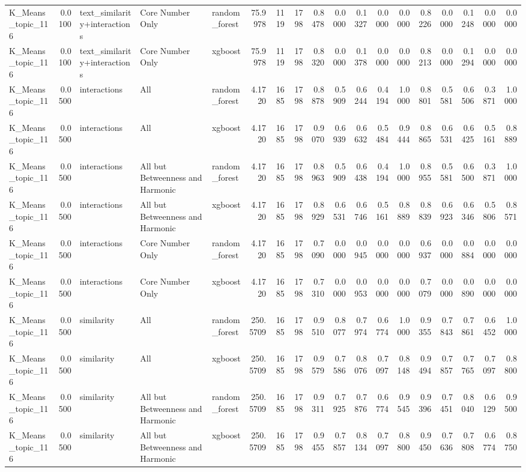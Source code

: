 \begin{tabular}{lrlllrrrrrrrrrrrrr}
K_Means_topic_116 & 0.0100 & text_similarity+interactions & Core Number Only & random_forest & 75.9978 & 1119 & 1798 & 0.8478 & 0.0000 & 0.1327 & 0.0000 & 0.0000 & 0.8226 & 0.0000 & 0.1248 & 0.0000 & 0.0000 \\
K_Means_topic_116 & 0.0100 & text_similarity+interactions & Core Number Only & xgboost & 75.9978 & 1119 & 1798 & 0.8320 & 0.0000 & 0.1378 & 0.0000 & 0.0000 & 0.8213 & 0.0000 & 0.1294 & 0.0000 & 0.0000 \\
K_Means_topic_116 & 0.0500 & interactions & All & random_forest & 4.1720 & 1685 & 1798 & 0.8878 & 0.5909 & 0.6244 & 0.4194 & 1.0000 & 0.8801 & 0.5581 & 0.6506 & 0.3871 & 1.0000 \\
K_Means_topic_116 & 0.0500 & interactions & All & xgboost & 4.1720 & 1685 & 1798 & 0.9070 & 0.6939 & 0.6632 & 0.5484 & 0.9444 & 0.8865 & 0.6531 & 0.6425 & 0.5161 & 0.8889 \\
K_Means_topic_116 & 0.0500 & interactions & All but Betweenness and Harmonic & random_forest & 4.1720 & 1685 & 1798 & 0.8963 & 0.5909 & 0.6438 & 0.4194 & 1.0000 & 0.8955 & 0.5581 & 0.6500 & 0.3871 & 1.0000 \\
K_Means_topic_116 & 0.0500 & interactions & All but Betweenness and Harmonic & xgboost & 4.1720 & 1685 & 1798 & 0.8929 & 0.6531 & 0.6746 & 0.5161 & 0.8889 & 0.8839 & 0.6923 & 0.6346 & 0.5806 & 0.8571 \\
K_Means_topic_116 & 0.0500 & interactions & Core Number Only & random_forest & 4.1720 & 1685 & 1798 & 0.7090 & 0.0000 & 0.0945 & 0.0000 & 0.0000 & 0.6937 & 0.0000 & 0.0884 & 0.0000 & 0.0000 \\
K_Means_topic_116 & 0.0500 & interactions & Core Number Only & xgboost & 4.1720 & 1685 & 1798 & 0.7310 & 0.0000 & 0.0953 & 0.0000 & 0.0000 & 0.7079 & 0.0000 & 0.0890 & 0.0000 & 0.0000 \\
K_Means_topic_116 & 0.0500 & similarity & All & random_forest & 250.5709 & 1685 & 1798 & 0.9510 & 0.8077 & 0.7974 & 0.6774 & 1.0000 & 0.9355 & 0.7843 & 0.7861 & 0.6452 & 1.0000 \\
K_Means_topic_116 & 0.0500 & similarity & All & xgboost & 250.5709 & 1685 & 1798 & 0.9579 & 0.7586 & 0.8076 & 0.7097 & 0.8148 & 0.9494 & 0.7857 & 0.7765 & 0.7097 & 0.8800 \\
K_Means_topic_116 & 0.0500 & similarity & All but Betweenness and Harmonic & random_forest & 250.5709 & 1685 & 1798 & 0.9311 & 0.7925 & 0.7876 & 0.6774 & 0.9545 & 0.9396 & 0.7451 & 0.8040 & 0.6129 & 0.9500 \\
K_Means_topic_116 & 0.0500 & similarity & All but Betweenness and Harmonic & xgboost & 250.5709 & 1685 & 1798 & 0.9455 & 0.7857 & 0.8134 & 0.7097 & 0.8800 & 0.9450 & 0.7636 & 0.7808 & 0.6774 & 0.8750 \\

\end{tabular}
